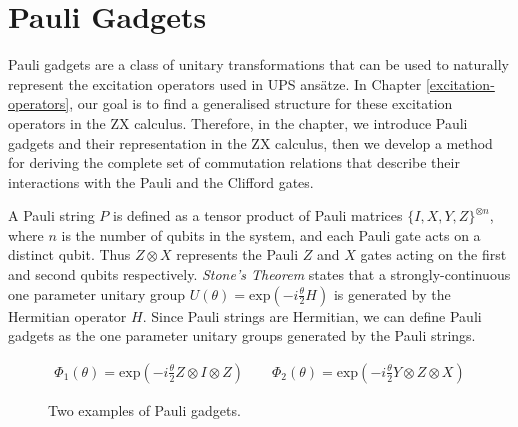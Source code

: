 \chapter{Pauli Gadgets}%
\label{pauli-gadgets}

Pauli gadgets are a class of unitary transformations that can be used to naturally represent the excitation operators used in UPS ansätze. In Chapter \ref{excitation-operators}, our goal is to find a generalised structure for these excitation operators in the ZX calculus. Therefore, in the chapter, we introduce Pauli gadgets and their representation in the ZX calculus, then we develop a method for deriving the complete set of commutation relations that describe their interactions with the Pauli and the Clifford gates.

A Pauli string $P$ is defined as a tensor product of Pauli matrices $\{I, X, Y, Z\}^{\otimes n}$, where $n$ is the number of qubits in the system, and each Pauli gate acts on a distinct qubit. Thus $Z \otimes X$ represents the Pauli $Z$ and $X$ gates acting on the first and second qubits respectively. \textit{Stone's Theorem} \cite{Stone1932} states that a strongly-continuous one parameter unitary group $U(\theta) = \text{exp} \left(- i \frac{\theta}{2} H \right)$ is generated by the Hermitian operator $H$. Since Pauli strings are Hermitian, we can define Pauli gadgets as the one parameter unitary groups generated by the Pauli strings.

\begin{figure}[H]
    \centering
    \begin{gather*}
        \Phi_1(\theta) = \text{exp}\left(- i \frac{\theta}{2} Z \otimes I \otimes Z \right) \qquad
        \Phi_2(\theta) = \text{exp}\left(- i \frac{\theta}{2} Y \otimes Z \otimes X \right)%
    \end{gather*}
    \caption{Two examples of Pauli gadgets.}
\end{figure}
